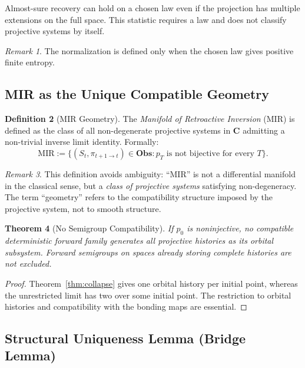 \documentclass[11pt,a4paper]{article}
\theoremstyle{plain}
\newtheorem{theorem}{Theorem}[section]
\theoremstyle{definition}
\newtheorem{definition}[theorem]{Definition}
\theoremstyle{remark}
\newtheorem{remark}[theorem]{Remark}
\begin{document}
Almost-sure recovery can hold on a chosen law even if the projection has multiple extensions on the full space. This statistic requires a law and does not classify projective systems by itself.

\begin{remark}\label{rem:law-dependent-isolation}
The normalization is defined only when the chosen law gives positive finite entropy.
\end{remark}

\subsection{MIR as the Unique Compatible Geometry}

\begin{definition}[MIR Geometry]\label{def:mir}
The \textit{Manifold of Retroactive Inversion} (MIR) is defined as the class of all non-degenerate projective systems in $\mathbf{C}$ admitting a non-trivial inverse limit identity. Formally:
\begin{equation}
    \text{MIR}:=\{(S_t,\pi_{t+1\to t})\in\mathbf{Obs}:p_T\text{ is not bijective for every }T\}.
\end{equation}
\end{definition}

\begin{remark}
This definition avoids ambiguity: ``MIR'' is not a differential manifold in the classical sense, but a \textit{class of projective systems} satisfying non-degeneracy. The term ``geometry'' refers to the compatibility structure imposed by the projective system, not to smooth structure.
\end{remark}

\begin{theorem}[No Semigroup Compatibility]\label{thm:nosemigroup}
If $p_0$ is noninjective, no compatible deterministic forward family generates all projective histories as its orbital subsystem. Forward semigroups on spaces already storing complete histories are not excluded.
\end{theorem}
\begin{proof}
Theorem~\ref{thm:collapse} gives one orbital history per initial point, whereas the unrestricted limit has two over some initial point. The restriction to orbital histories and compatibility with the bonding maps are essential.
\end{proof}

\subsection{Structural Uniqueness Lemma (Bridge Lemma)}
\end{document}
